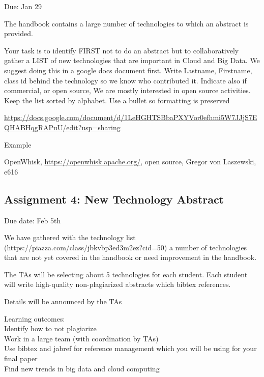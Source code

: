 Due: Jan 29

 

The handbook contains a large number of technologies to which an abstract is provided.

 
\vspace{5mm}
Your task is to identify FIRST not to do an abstract but to collaboratively gather a LIST of new technologies that are important in Cloud and Big Data. We suggest doing this in a google docs document first. Write Lastname, Firstname, class id behind the technology so we know who contributed it. Indicate also if commercial, or open source, We are mostly interested in open source activities. Keep the list sorted by alphabet. Use a bullet so formatting is preserved

 

\url{https://docs.google.com/document/d/1LeHGHTSBbaPXYVor0efhmi5W7JJjS7EQHABHqgRAPuU/edit?usp=sharing}

 

Example

 

OpenWhisk, \url{https://openwhisk.apache.org/}, open source, Gregor von Laszewski, e616
 



\subsection*{Assignment 4: New Technology Abstract}

 
Due date: Feb 5th\\

 \vspace{5mm}

We have gathered with the technology list (https://piazza.com/class/jbkvbp3ed3m2ez?cid=50) a number of technologies that are not yet covered in the handbook or need improvement in the handbook.\\

\vspace{5mm}
 

The TAs will be selecting about 5 technologies for each student. Each student will write high-quality non-plagiarized abstracts which bibtex references.\\
\vspace{5mm}
 

Details will be announced by the TAs\\
\vspace{5mm}
 

Learning outcomes:\\

\noindent Identify how to not plagiarize\\
Work in a large team (with coordination by TAs)\\
Use bibtex and jabref for reference management which you will be using for your final paper\\
Find new trends in big data and cloud computing\\
 

